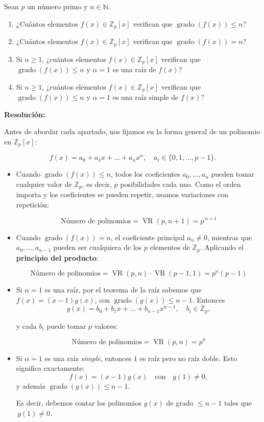 \documentclass[a4paper,12pt]{article}
\begin{document}
\begin{ejercicio}[title=Ejercicio 3]
Sean $p$ un número primo y $n \in \mathbb{N}$.

\begin{enumerate}
\item[a)] ¿Cuántos elementos $f(x) \in \mathbb{Z}_p[x]$ verifican que $\operatorname{grado}(f(x)) \leq n$?
\item[b)] ¿Cuántos elementos $f(x) \in \mathbb{Z}_p[x]$ verifican que $\operatorname{grado}(f(x)) = n$?
\item[c)] Si $n \ge 1$, ¿cuántos elementos $f(x) \in \mathbb{Z}_p[x]$ verifican que $\operatorname{grado}(f(x)) \le n$ y $\alpha = 1$ es una raíz de $f(x)$?
\item[d)] Si $n \ge 1$, ¿cuántos elementos $f(x) \in \mathbb{Z}_p[x]$ verifican que $\operatorname{grado}(f(x)) \le n$ y $\alpha = 1$ es una raíz simple de $f(x)$?
\end{enumerate}

\tcblower
\textbf{Resolución:}

Antes de abordar cada apartado, nos fijamos en la forma general de un polinomio en $\mathbb{Z}_p[x]$:

\[
f(x) = a_0 + a_1 x + \dots + a_n x^n, \quad a_i \in \{0,1,\dots,p-1\}.
\]

\begin{itemize}
\item[a)] Cuando $\operatorname{grado}(f(x)) \le n$, todos los coeficientes $a_0,\dots,a_n$ pueden tomar cualquier valor de $\mathbb{Z}_p$, es decir, $p$ posibilidades cada uno. Como el orden importa y los coeficientes se pueden repetir, usamos variaciones con repetición:

\[
\text{Número de polinomios} = \operatorname{VR}(p,n+1) = \boxed{p^{\,n+1}}
\]

\item[b)] Cuando $\operatorname{grado}(f(x)) = n$, el coeficiente principal $a_n \neq 0$, mientras que $a_0,\dots,a_{n-1}$ pueden ser cualquiera de los $p$ elementos de $\mathbb{Z}_p$. Aplicando el \textbf{principio del producto}:

\[
\text{Número de polinomios} = \operatorname{VR}(p,n) \cdot \operatorname{VR}(p-1,1) = \boxed{p^n(p-1)}
\]

\item[c)] Si $\alpha = 1$ es una raíz, por el teorema de la raíz sabemos que $f(x) = (x-1)g(x)$, con $\operatorname{grado}(g(x)) \le n-1$. Entonces
\[
g(x) = b_0 + b_1 x + \dots + b_{n-1} x^{n-1}, \quad b_i \in \mathbb{Z}_p,
\]

y cada $b_i$ puede tomar $p$ valores:

\[
\text{Número de polinomios} = \operatorname{VR}(p,n)= \boxed{p^n}
\]

\item[d)] Si $\alpha = 1$ es una raíz \emph{simple}, entonces $1$ es raíz pero no raíz doble.  
Esto significa exactamente:
\[
f(x) = (x-1)g(x)
\quad\text{con}\quad g(1)\neq 0,
\]
y además $\operatorname{grado}(g(x))\le n-1$.

Es decir, debemos contar los polinomios $g(x)$ de grado $\le n-1$ tales que \(\,g(1)\neq 0.\)

\end{itemize}
\end{ejercicio}
\end{document}

